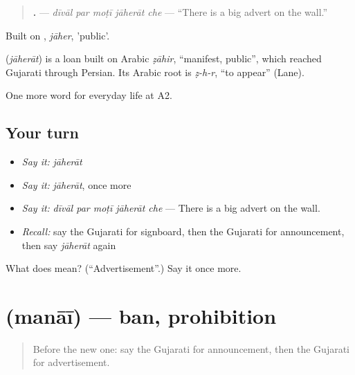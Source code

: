 \begin{quote}
\textbf{    .} — \emph{dīvāl par moṭī jāherāt che} — \textquotedblleft{}There is a big advert on the wall.\textquotedblright{}
\end{quote}

Built on \textbf{}, \emph{jāher}, 'public'.

\begin{cousinweb}
\textbf{} (\emph{jāherāt}) is a loan built on Arabic \emph{ẓāhir}, \textquotedblleft{}manifest, public\textquotedblright{}, which reached Gujarati through Persian. Its Arabic root is \emph{ẓ-h-r}, \textquotedblleft{}to appear\textquotedblright{} (Lane).
\end{cousinweb}

\begin{grammarlens}[title={What you've built}]
One more word for everyday life at A2.
\end{grammarlens}

\subsection*{Your turn}
\begin{itemize}
\raggedright
  \item \emph{Say it:} \emph{jāherāt}
  \item \emph{Say it:} \emph{jāherāt}, once more
  \item \emph{Say it:} \emph{dīvāl par moṭī jāherāt che} — There is a big advert on the wall.
  \item \emph{Recall:} say the Gujarati for signboard, then the Gujarati for announcement, then say \emph{jāherāt} again
\end{itemize}

\begin{tcolorbox}[breakable,colback=teal!4,colframe=teal!35!black,title={Before you move on}]
What does  mean? (\textquotedblleft{}Advertisement\textquotedblright{}.) Say it once more.
\end{tcolorbox}
\section[\texorpdfstring{\gu{મનાઈ} (manāī)}{મનાઈ (manāī)}]{ (manāī) — ban, prohibition}

\label{lesson:GU-C198-manai}



\begin{quote}
Before the new one: say the Gujarati for announcement, then the Gujarati for advertisement.
\end{quote}

